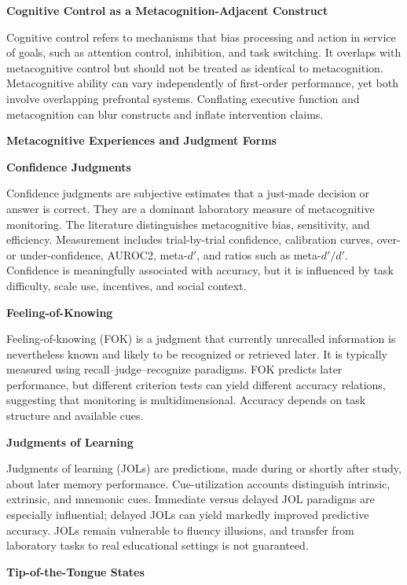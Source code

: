 \documentclass{book}
\providecommand{\ProjectDeepHeading}[2]{%
    \par\medskip\noindent\textbf{#2}\par\smallskip
}
\begin{document}
   \ProjectDeepHeading{7}{Cognitive Control as a Metacognition-Adjacent Construct}

   Cognitive control refers to mechanisms that bias processing and action in service of goals, such as attention control, inhibition, and task switching. It overlaps with metacognitive control but should not be treated as identical to metacognition. Metacognitive ability can vary independently of first-order performance, yet both involve overlapping prefrontal systems. Conflating executive function and metacognition can blur constructs and inflate intervention claims.

   \ProjectDeepHeading{5}{Metacognitive Experiences and Judgment Forms}

   \ProjectDeepHeading{6}{Confidence Judgments}

   Confidence judgments are subjective estimates that a just-made decision or answer is correct. They are a dominant laboratory measure of metacognitive monitoring. The literature distinguishes metacognitive bias, sensitivity, and efficiency. Measurement includes trial-by-trial confidence, calibration curves, over- or under-confidence, AUROC2, meta-$d'$, and ratios such as meta-$d'/d'$. Confidence is meaningfully associated with accuracy, but it is influenced by task difficulty, scale use, incentives, and social context.

   \ProjectDeepHeading{6}{Feeling-of-Knowing}

   Feeling-of-knowing (FOK) is a judgment that currently unrecalled information is nevertheless known and likely to be recognized or retrieved later. It is typically measured using recall--judge--recognize paradigms. FOK predicts later performance, but different criterion tests can yield different accuracy relations, suggesting that monitoring is multidimensional. Accuracy depends on task structure and available cues.

   \ProjectDeepHeading{6}{Judgments of Learning}

   Judgments of learning (JOLs) are predictions, made during or shortly after study, about later memory performance. Cue-utilization accounts distinguish intrinsic, extrinsic, and mnemonic cues. Immediate versus delayed JOL paradigms are especially influential; delayed JOLs can yield markedly improved predictive accuracy. JOLs remain vulnerable to fluency illusions, and transfer from laboratory tasks to real educational settings is not guaranteed.

   \ProjectDeepHeading{6}{Tip-of-the-Tongue States}
\end{document}
